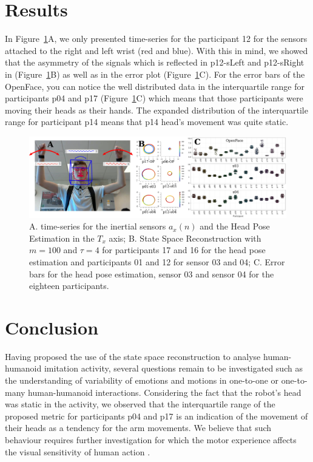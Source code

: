 \documentclass{sigchi}
\begin{document}
\section{Results}
In Figure~\ref{fig:main}A, we only presented time-series for the participant 12
for the sensors attached to the right and left wrist (red and blue).
With this in mind, we showed that the asymmetry of the signals which is
reflected in p12-sLeft and p12-sRight in (Figure~\ref{fig:main}B) as well as in the
error plot (Figure~\ref{fig:main}C).
For the error bars of the OpenFace, you can notice the well distributed
data in the interquartile range for participants p04 and p17 (Figure~\ref{fig:main}C)
which means that those participants were moving their heads as their hands.
The expanded distribution of the interquartile range for participant p14
means that p14 head's movement was quite static.
\begin{figure}[!htb]
\centering
\includegraphics[width=1.00\textwidth]{figures/results/main/figv01}
\caption[PA]{
A. time-series for the inertial sensors $a_x(n)$ and the
Head Pose Estimation in the $T_x$ axis;
B. State Space Reconstruction with $m=100$ and $\tau=4$ for
participants 17 and 16 for the head pose estimation and
participants 01 and 12 for sensor 03 and 04;
C. Error bars for the head pose estimation, sensor 03 and sensor 04 for
the eighteen participants.}
\label{fig:main}
\end{figure}


\section{Conclusion}


Having proposed the use of the state space reconstruction to analyse human-humanoid
imitation activity, several questions remain to be investigated such as the
understanding of variability of emotions and motions in one-to-one or
one-to-many human-humanoid interactions.
Considering the fact that the robot's head was static in the activity,
we observed that the interquartile range of the proposed metric for participants p04 and p17
is an indication of the movement of their heads as a tendency for the arm movements.
We believe that such behaviour requires further investigation for which the motor
experience affects the visual sensitivity of human action \cite{blake2007}.
\end{document}
